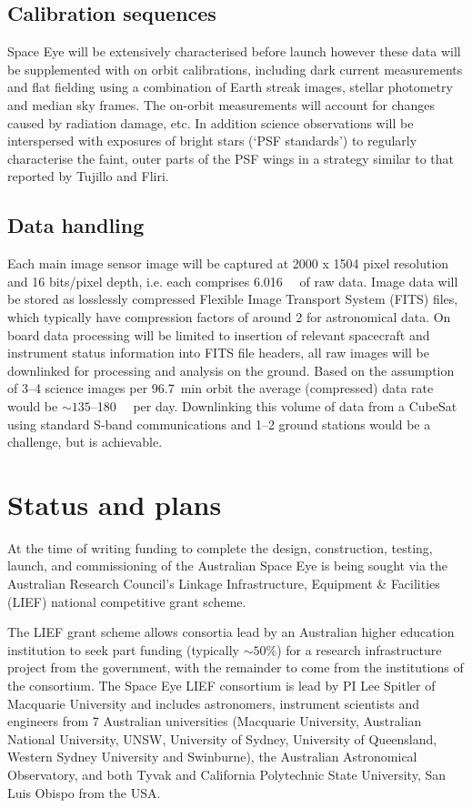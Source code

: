\documentclass[]{iac}
\begin{document}
\subsection{Calibration sequences}

Space Eye will be extensively characterised before launch however these data will be supplemented with on orbit
calibrations, including dark current measurements and flat fielding using a combination of Earth streak images, stellar
photometry and median sky frames. The on-orbit measurements will account for changes caused by radiation damage, etc.
In addition science observations will be interspersed with exposures of bright stars (`PSF standards') to regularly
characterise the faint, outer parts of the PSF wings in a strategy similar to that reported by Tujillo and
Fliri\cite{Trujillo2015}.

\subsection{Data handling}

Each main image sensor image will be captured at 2000 x 1504 pixel resolution and 16 bits/pixel depth, i.e. each
comprises \SI{6.016}{\mega\byte} of raw data. Image data will be stored as losslessly compressed Flexible Image
Transport System (FITS) files, which typically have compression factors of around 2 for astronomical data. On board data
processing will be limited to insertion of relevant spacecraft and instrument status information into FITS file headers,
all raw images will be downlinked for processing and analysis on the ground. Based on the assumption of 3--4 science
images per \SI{96.7}{\minute} orbit the average (compressed) data rate would be $\sim135$--\SI{180}{\mega\byte} per day.
Downlinking this volume of data from a CubeSat using standard S-band communications and 1--2 ground stations would be a
challenge, but is achievable\cite{Reisenfeld2015}.

\section{Status and plans}

At the time of writing funding to complete the design, construction, testing, launch, and commissioning of the
Australian Space Eye is being sought via the Australian Research Council's Linkage Infrastructure, Equipment \&
Facilities (LIEF) national competitive grant scheme.

The LIEF grant scheme allows consortia lead by an Australian higher education institution to seek part funding
(typically $\sim50\%$) for a research infrastructure project from the government, with the remainder to come from the
institutions of the consortium. The Space Eye LIEF consortium is lead by PI Lee Spitler of Macquarie University and
includes astronomers, instrument scientists and engineers from 7 Australian universities (Macquarie University,
Australian National University, UNSW, University of Sydney, University of Queensland, Western Sydney University and
Swinburne), the Australian Astronomical Observatory, and both Tyvak and California Polytechnic State University, San
Luis Obispo from the USA.
\end{document}
